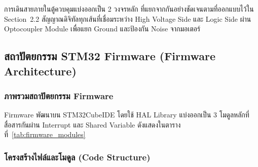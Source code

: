 
การเดินสายภายในตู้ควบคุมแบ่งออกเป็น 2 วงจรหลัก
ที่แยกจากกันอย่างชัดเจนตามที่ออกแบบไว้ใน Section~2.2
สัญญาณดิจิทัลทุกเส้นที่เชื่อมระหว่าง High Voltage Side
และ Logic Side ผ่าน Optocoupler Module
เพื่อแยก Ground และป้องกัน Noise จากมอเตอร์

\subsection{สถาปัตยกรรม STM32 Firmware (Firmware Architecture)}
\label{subsec:firmware_architecture}

\subsubsection{ภาพรวมสถาปัตยกรรม Firmware}
\label{subsubsec:firmware_architecture_overview}

Firmware พัฒนาบน STM32CubeIDE โดยใช้ HAL Library
แบ่งออกเป็น 3 โมดูลหลักที่สื่อสารกันผ่าน Interrupt
และ Shared Variable ดังแสดงในตารางที่~\ref{tab:firmware_modules}

\subsubsection{โครงสร้างไฟล์และโมดูล (Code Structure)}
\label{subsubsec:code_structure}

